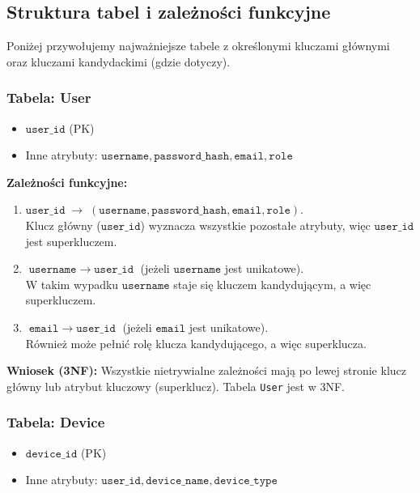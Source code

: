 \documentclass[12pt,a4paper]{article}
\begin{document}
\subsection{Struktura tabel i zależności funkcyjne}
Poniżej przywołujemy najważniejsze tabele z określonymi kluczami głównymi oraz kluczami kandydackimi (gdzie dotyczy).

\subsubsection{Tabela: User}
\begin{itemize}
    \item \(\texttt{user\_id}\) (PK)
    \item Inne atrybuty: \(\texttt{username}, \texttt{password\_hash}, \texttt{email}, \texttt{role}\)
\end{itemize}

\noindent \textbf{Zależności funkcyjne:}
\begin{enumerate}
    \item \(\texttt{user\_id} \;\rightarrow\; (\texttt{username}, \texttt{password\_hash}, \texttt{email}, \texttt{role})\). \\
          Klucz główny (\(\texttt{user\_id}\)) wyznacza wszystkie pozostałe atrybuty, więc \(\texttt{user\_id}\) jest superkluczem.
    \item \(\texttt{username} \;\rightarrow\; \texttt{user\_id}\) (jeżeli \(\texttt{username}\) jest unikatowe). \\
          W takim wypadku \(\texttt{username}\) staje się kluczem kandydującym, a więc superkluczem.
    \item \(\texttt{email} \;\rightarrow\; \texttt{user\_id}\) (jeżeli \(\texttt{email}\) jest unikatowe). \\
          Również może pełnić rolę klucza kandydującego, a więc superklucza.
\end{enumerate}

\noindent \textbf{Wniosek (3NF):}
Wszystkie nietrywialne zależności mają po lewej stronie klucz główny lub atrybut kluczowy (superklucz). Tabela \texttt{User} jest w 3NF.

\subsubsection{Tabela: Device}
\begin{itemize}
    \item \(\texttt{device\_id}\) (PK)
    \item Inne atrybuty: \(\texttt{user\_id}, \texttt{device\_name}, \texttt{device\_type}\)
\end{itemize}
\end{document}

